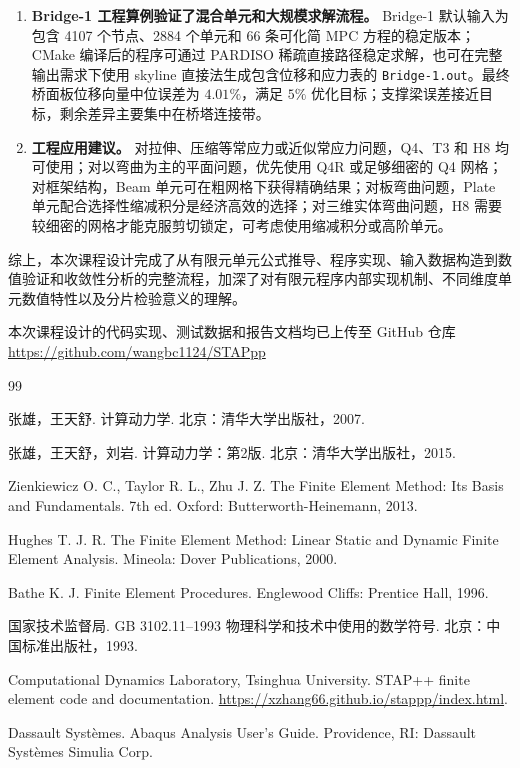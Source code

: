 \documentclass[UTF8,a4paper,zihao=-4]{ctexart}
\begin{document}
\begin{enumerate}
    \item \textbf{Bridge-1 工程算例验证了混合单元和大规模求解流程。}
    Bridge-1 默认输入为包含 4107 个节点、2884 个单元和 66 条可化简 MPC 方程的稳定版本；CMake 编译后的程序可通过 PARDISO 稀疏直接路径稳定求解，也可在完整输出需求下使用 skyline 直接法生成包含位移和应力表的 \texttt{Bridge-1.out}。最终桥面板位移向量中位误差为 $4.01\%$，满足 $5\%$ 优化目标；支撑梁误差接近目标，剩余差异主要集中在桥塔连接带。

    \item \textbf{工程应用建议。}
    对拉伸、压缩等常应力或近似常应力问题，Q4、T3 和 H8 均可使用；对以弯曲为主的平面问题，优先使用 Q4R 或足够细密的 Q4 网格；对框架结构，Beam 单元可在粗网格下获得精确结果；对板弯曲问题，Plate 单元配合选择性缩减积分是经济高效的选择；对三维实体弯曲问题，H8 需要较细密的网格才能克服剪切锁定，可考虑使用缩减积分或高阶单元。
\end{enumerate}

综上，本次课程设计完成了从有限元单元公式推导、程序实现、输入数据构造到数值验证和收敛性分析的完整流程，加深了对有限元程序内部实现机制、不同维度单元数值特性以及分片检验意义的理解。

本次课程设计的代码实现、测试数据和报告文档均已上传至 GitHub 仓库 \url{https://github.com/wangbc1124/STAPpp}
\begin{thebibliography}{99}

张雄，王天舒.
\newblock 计算动力学.
\newblock 北京：清华大学出版社，2007.

张雄，王天舒，刘岩.
\newblock 计算动力学：第2版.
\newblock 北京：清华大学出版社，2015.

Zienkiewicz O. C., Taylor R. L., Zhu J. Z.
\newblock The Finite Element Method: Its Basis and Fundamentals.
\newblock 7th ed. Oxford: Butterworth-Heinemann, 2013.

Hughes T. J. R.
\newblock The Finite Element Method: Linear Static and Dynamic Finite Element Analysis.
\newblock Mineola: Dover Publications, 2000.

Bathe K. J.
\newblock Finite Element Procedures.
\newblock Englewood Cliffs: Prentice Hall, 1996.

国家技术监督局.
\newblock GB 3102.11--1993 物理科学和技术中使用的数学符号.
\newblock 北京：中国标准出版社，1993.

Computational Dynamics Laboratory, Tsinghua University.
\newblock STAP++ finite element code and documentation.
\newblock \url{https://xzhang66.github.io/stappp/index.html}.

Dassault Systèmes.
\newblock Abaqus Analysis User's Guide.
\newblock Providence, RI: Dassault Systèmes Simulia Corp.

\end{thebibliography}
\end{document}
